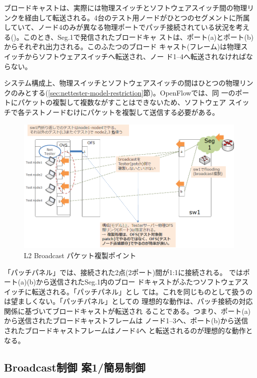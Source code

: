 ブロードキャストは、実際には物理スイッチとソフトウェアスイッチ間の物理リ
ンクを経由して転送される。4台のテスト用ノードがひとつのセグメントに所属
していて、ノード4のみが異なる物理ポートでパッチ接続されている状況を考え
る()。このとき、Seg.1で発信されたブロードキャ
ストは、ポート(a)とポート(b)からそれぞれ出力される。このふたつのブロード
キャスト(フレーム)は物理スイッチからソフトウェアスイッチへ転送され、ノー
ド1--4へ転送されなければならない。

システム構成上、物理スイッチとソフトウェアスイッチの間はひとつの物理リン
クのみとする(\ref{sec:nettester-model-restriction}節)。OpenFlowでは、同
一のポートにパケットの複製して複数ながすことはできないため、ソフトウェア
スイッチで各テストノードむけにパケットを複製して送信する必要がある。

\begin{figure}[h]
 \centering
 \includegraphics[scale=0.6]{img/l2bcctrl_req4.png}
 \caption{L2 Broadcast パケット複製ポイント}
 \label{fig:l2bcctrl_req4}
\end{figure}

「パッチパネル」では、接続された2点(2ポート)間が1:1に接続される。
ではポート(a)(b)から送信されたSeg.1内のブロー
ドキャストがふたつソフトウェアスイッチに転送される。「パッチパネル」とし
ては。これを同じものとして扱うのは望ましくない。「パッチパネル」としての
理想的な動作は、パッチ接続の対応関係に基づいてブロードキャストが転送され
ることである。つまり、ポート(a)から送信されたブロードキャストフレームは
ノード1--3へ、ポート(b)から送信されたブロードキャストフレームはノード4へ
と転送されるのが理想的な動作となる。

  \subsection{Broadcast制御 案1/簡易制御}
  \label{sec:l2bcctrl-plan1}

